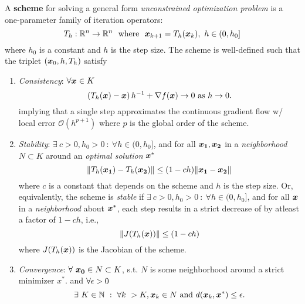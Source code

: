 \documentclass[10pt]{article}
\begin{document}
        \begin{definition}
            A \textbf{scheme} for solving a general form \emph{unconstrained optimization problem}
            is a one-parameter family of iteration operators:
            $$
                T_h : \mathbb{R}^n \rightarrow \mathbb{R}^n ~ \text{ where } ~\bm{x}_{k+1} = T_h(\bm{x}_k), ~ h \in (0, h_0]
            $$
            where $h_0$ is a constant and $h$ is the step size. The scheme is well-defined such that
            the triplet $(\bm{x}_0, h, T_h)$ satisfy
            \begin{enumerate}
                \item \emph{Consistency}: $\forall \bm{x} \in K$ 
                $$
                    \left( T_h(\bm{x}) - \bm{x} \right) h^{-1} + \nabla f(\bm{x}) \rightarrow 0 \text{ as } h \rightarrow 0.
                $$
                implying that a single step approximates the continuous gradient flow w/ local error
                $\mathcal{O}(h^{p+1})$ where $p$ is the global order of the scheme.
                \item \emph{Stability}: $\exists~ c > 0, h_0 > 0 ~:~ \forall h \in (0, h_0]$,
                and for all $\bm{x_1}, \bm{x_2}$ in a \emph{neighborhood $N \subset K$}
                around an \emph{optimal solution} $\bm{x}^*$
                $$
                    \| T_h(\bm{x_1}) - T_h(\bm{x_2}) \| \leq (1 - ch) \| \bm{x_1} - \bm{x_2} \|
                $$
                where $c$ is a constant that depends on the scheme and $h$ is the step size.
                Or, equivalently, the scheme is \emph{stable} if
                $\exists~ c > 0, h_0 > 0 ~:~ \forall h \in (0, h_0]$,
                and for all $\bm{x}$ in a \emph{neighborhood} about $\bm{x}^*$,
                each step results in a strict decrease of by atleast a factor of $1 - ch$, i.e.,
                $$
                \| J(T_h(\bm{x})) \| \leq (1 - ch)
                $$
                where $J(T_h(\bm{x}))$ is the Jacobian of the scheme.
                \item \emph{Convergence}: $\forall~ \bm{x_0} \in N \subset K$, s.t. $N$ is some neighborhood
                around a strict minimizer $x^*$. and $\forall \epsilon > 0$ 
                $$
                    \exists~ K \in \mathbb{N} ~:~ \forall k ~ > K, \bm{x}_k \in N \text{ and } 
                    d(\bm{x}_k, \bm{x}^*) \leq \epsilon.
                $$
            \end{enumerate}
        \end{definition}
\end{document}
